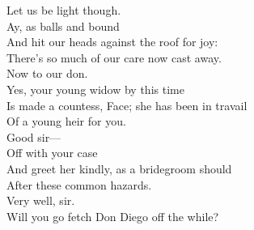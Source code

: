 \documentclass[a4paper,oneside,12pt]{memoir}
\begin{document}
\begin{drama*}
Let us be light though.\\
\subtlespeaks {}  Ay, as balls and bound\\
And hit our heads against the roof for joy:\\
There's so much of our care now cast away.\\
\facespeaks Now to our don.\\
\subtlespeaks {} Yes, your young widow by this time\\
Is made a countess, Face; she has been in travail\\
Of a young heir for you.\\
\facespeaks {} Good sir---\\
\subtlespeaks {} Off with your case\\
And greet her kindly, as a bridegroom should\\
After these common hazards.\\
\facespeaks {} Very well, sir.\\
Will you go fetch Don Diego off the while?\\

\scene


\end{drama*}
\end{document}
